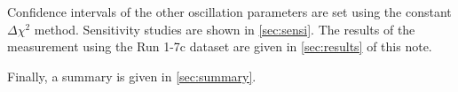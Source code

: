 Confidence intervals of the other oscillation parameters are set using the 
constant $\Delta \chi^2$ method.
Sensitivity studies are shown in \cref{sec:sensi}.
The results of the measurement using the Run 1-7c dataset are given in \cref{sec:results} of this note. 


Finally, a summary is given in \cref{sec:summary}.  

\clearpage

